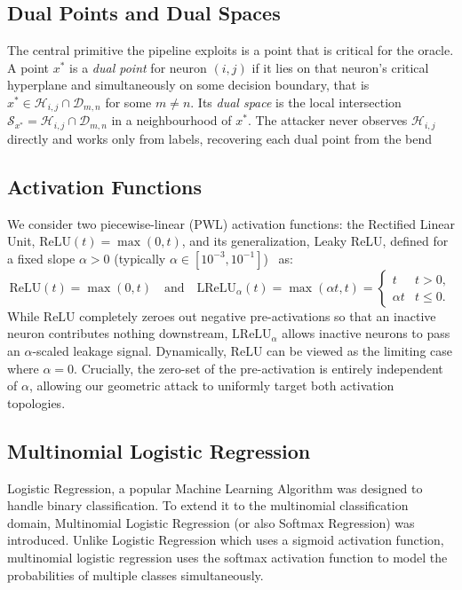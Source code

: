 \documentclass[runningheads,orivec]{llncs}
\begin{document}
\subsection{Dual Points and Dual Spaces}
The central primitive the pipeline exploits is a point that is critical for the oracle. A point $x^\ast$ is a \emph{dual point} for neuron $(i,j)$ if it lies on that neuron's critical hyperplane and simultaneously on some decision boundary, that
is $x^\ast \in \mathcal{H}_{i,j} \cap \mathcal{D}_{m,n}$ for some $m \neq n$. Its \emph{dual space} is the local intersection
$\mathcal{S}_{x^\ast} = \mathcal{H}_{i,j} \cap \mathcal{D}_{m,n}$ in a neighbourhood of $x^\ast$. The attacker never observes $\mathcal{H}_{i,j}$ directly and works only from labels, recovering each dual point from the bend

\subsection{Activation Functions}
\label{app:prelim:relu}
We consider two piecewise-linear (PWL) activation functions: the Rectified Linear Unit, $\text{ReLU}(t) = \max(0, t)$, and its generalization, Leaky ReLU, defined for a fixed slope $\alpha > 0$ (typically $\alpha \in [10^{-3}, 10^{-1}]$)~\cite{maas2013leakyrelu} as:
\begin{equation}
    \text{ReLU}(t) = \max(0, t) \quad \text{and} \quad \text{LReLU}_\alpha(t) = \max(\alpha t, t) = \begin{cases} t & t > 0, \\ \alpha t & t \leq 0. \end{cases}
\end{equation}
While $\text{ReLU}$ completely zeroes out negative pre-activations so that an inactive neuron contributes nothing downstream, $\text{LReLU}_\alpha$ allows inactive neurons to pass an $\alpha$-scaled leakage signal. Dynamically, $\text{ReLU}$ can be viewed as the limiting case where $\alpha = 0$. Crucially, the zero-set of the pre-activation is entirely independent of $\alpha$, allowing our geometric attack to uniformly target both activation topologies.

\subsection{Multinomial Logistic Regression}
\label{app:prelim:multinomiallogreg}
Logistic Regression, a popular Machine Learning Algorithm was designed to handle binary classification. To extend it to the multinomial classification domain, Multinomial Logistic Regression (or also Softmax Regression) was introduced. Unlike Logistic Regression which uses a sigmoid activation function, multinomial logistic regression uses the softmax activation function to model the probabilities of multiple classes simultaneously.
\end{document}
